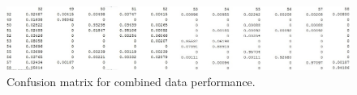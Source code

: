 \documentclass{sig-alternate}
\begin{document}
\begin{figure}
\begin{center}
  \includegraphics[width=1.0\linewidth]{visual_results/nConfkNN_both.jpg}
\end{center}
  \caption{Confusion matrix for combined data performance.}
  \label{fig:conf_both}
\end{figure}

%


\end{document}

